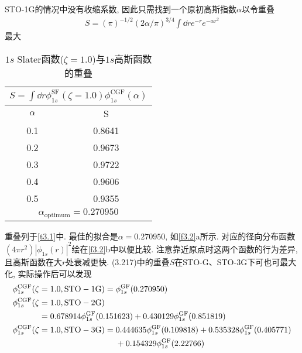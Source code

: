 STO-1G的情况中没有收缩系数, 因此只需找到一个原初高斯指数$\alpha$以令重叠
\begin{align}
	S = (\pi)^{-1/2}(2\alpha/\pi)^{3/4}\int\dd{r}e^{-r}e^{-\alpha r^2}
\end{align}
最大
\begin{table}[H]
	\centering
	\caption{$1s$ Slater函数($\zeta=1.0$)与$1s$高斯函数的重叠}
	\begin{tabular}{cc}
		\multicolumn{2}{c}{$ S=\int\dd{r}\phi_{1s}^\mathrm{SF}(\zeta=1.0)\phi_{1s}^\mathrm{CGF}(\alpha)$} \\ \hline
		$\alpha$ &                                           S                                            \\ \hline
		0.1    &                                         0.8641                                         \\
		0.2    &                                         0.9673                                         \\
		0.3    &                                         0.9722                                         \\
		0.4    &                                         0.9606                                         \\
		0.5    &                                         0.9355                                         \\ \hline
		\multicolumn{2}{c}{$\alpha_\mathrm{optimum}=0.270950$}
	\end{tabular}
	\label{t3.1}
\end{table}
重叠列于\autoref{t3.1}中. 
最佳的拟合是$\alpha=0.270950$, 
如\autoref{f3.2}a所示. 
对应的径向分布函数$(4\pi r^2)|\phi_{1s}(r)|^2$绘在\autoref{f3.2}b中以便比较. 
注意靠近原点时这两个函数的行为差异, 
且高斯函数在大$r$处衰减更快. 
(3.217)中的重叠$S$在STO-G、STO-3G下可也可最大化, 
实际操作后可以发现
\begin{alignat}{2}
	\label{3.219}
	\phi_{1s}^\mathrm{CGF}(\zeta&=1.0,\mathrm{STO-1G}) = \phi_{1s}^\mathrm{GF}(0.270950)\\
	\phi_{1s}^\mathrm{CGF}(\zeta&=1.0,\mathrm{STO-2G})\notag\\
	&=0.678914\phi_{1s}^\mathrm{GF}(0.151623) +0.430129\phi_{1s}^\mathrm{GF}(0.851819)\\
	\phi_{1s}^\mathrm{CGF}(\zeta&=1.0,\mathrm{STO-3G})=
	\begin{alignedat}[t]{1}&0.444635\phi_{1s}^\mathrm{GF}(0.109818) + 0.535328\phi_{1s}^\mathrm{GF}(0.405771)\\& + 0.154329\phi_{1s}^\mathrm{GF}(2.22766)\end{alignedat}
\end{alignat}

